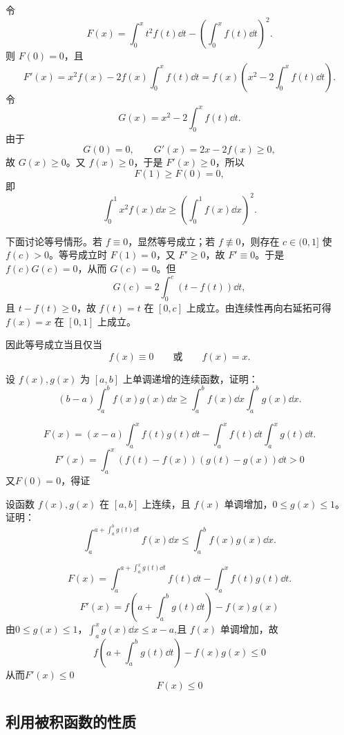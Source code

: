 \begin{solution}
	令
	\[
	F(x)=\int_0^x t^2 f(t)\dd t-\left(\int_0^x f(t)\dd t\right)^2.
	\]
	则 $F(0)=0$，且
	\[
	F'(x)=x^2f(x)-2f(x)\int_0^x f(t)\dd t
	=f(x)\left(x^2-2\int_0^x f(t)\dd t\right).
	\]
	令
	\[
	G(x)=x^2-2\int_0^x f(t)\dd t.
	\]
	由于
	\[
	G(0)=0,\qquad
	G'(x)=2x-2f(x)\geq 0,
	\]
	故 $G(x)\geq0$。又 $f(x)\geq0$，于是 $F'(x)\geq0$，所以
	\[
	F(1)\geq F(0)=0,
	\]
	即
	\[
	\int_0^1 x^2 f(x)\dd x\geq \left(\int_0^1 f(x)\dd x\right)^2.
	\]
	
	下面讨论等号情形。若 $f\equiv0$，显然等号成立；若 $f\not\equiv0$，则存在 $c\in(0,1]$ 使 $f(c)>0$。等号成立时 $F(1)=0$，又 $F'\geq0$，故 $F'\equiv0$。于是 $f(c)G(c)=0$，从而 $G(c)=0$。但
	\[
	G(c)=2\int_0^c(t-f(t))\dd t,
	\]
	且 $t-f(t)\geq0$，故 $f(t)=t$ 在 $[0,c]$ 上成立。由连续性再向右延拓可得 $f(x)=x$ 在 $[0,1]$ 上成立。
	
	因此等号成立当且仅当
	\[
	f(x)\equiv0\qquad\text{或}\qquad f(x)=x.
	\]
\end{solution}

\begin{problem}
	设 $f(x),g(x)$ 为 $[a,b]$ 上单调递增的连续函数，证明：
	\[
	(b-a)\int_a^b f(x)g(x)\dd x
	\geq
	\int_a^b f(x)\dd x\int_a^b g(x)\dd x.
	\]
\end{problem}

\begin{solution}
	\[
	F(x)=(x-a)\int_a^x f(t)g(t)\dd t
	-
	\int_a^x f(t)\dd t\int_a^x g(t)\dd t.
	\]
	\[F'(x) = \int_{a}^{x}(f(t)-f(x))(g(t)-g(x))\dd t>0\]
	又$F(0)=0$，得证
\end{solution}

\begin{problem}
	设函数 $f(x),g(x)$ 在 $[a,b]$ 上连续，且 $f(x)$ 单调增加，$0\leq g(x)\leq1$。证明：
	\[
	\int_a^{a+\int_a^b g(t)\dd t} f(x)\dd x
	\leq
	\int_a^b f(x)g(x)\dd x.
	\]
\end{problem}

\begin{solution}
	\[
	F(x)=\int_a^{a+\int_a^x g(t)\dd t} f(t)\dd t
	-
	\int_a^x f(t)g(t)\dd t.
	\]
	\[F'(x)=f(a+\int_a^b g(t)\dd t)-f(x)g(x)\]
	由$0\leq g(x)\leq1$，$\displaystyle\int_{a}^{x}g(x)\dd x    \leqslant x-a$,且 $f(x)$ 单调增加，故\[f(a+\int_a^b g(t)\dd t)-f(x)g(x)\leqslant 0\]
	从而$F'(x)\leqslant 0$\[F(x)\leqslant 0\]
\end{solution}

\subsection*{利用被积函数的性质}

